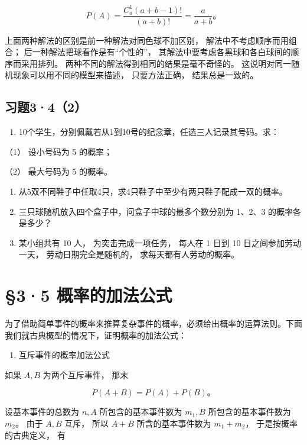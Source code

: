 \[
P(A)=\frac{C_a^1(a+b-1)!}{(a+b)!}=\frac{a}{a+b}\text{。}
\]

上面两种解法的区别是前一种解法对同色球不加区别，
解法中不考虑顺序而用组合； 后一种解法把球看作是有``个性的''，
其解法中要考虑各黑球和各白球间的顺序而采用排列。
两种不同的解法得到相同的结果是毫不奇怪的。
这说明对同一随机现象可以用不同的模型来描述， 只要方法正确，
结果总是一致的。

\subsection{习题3·4（2）}

\begin{enumerate}
\item
  10个学生，分别佩戴若从1到10号的纪念章，任选三人记录其号码。求：
\end{enumerate}

（1） 设小号码为 5 的概率；

（2） 最大号码为 5 的概率。

\begin{enumerate}[start=2]
\item
  从5双不同鞋子中任取4只，求4只鞋子中至少有两只鞋子配成一双的概率。
\item
  三只球随机放入四个盒子中，问盒子中球的最多个数分别为 1、2、3
  的概率各是多少？
\item
  某小组共有 10 人， 为突击完成一项任务， 每人在 1 日到 10
  日之间参加劳动一天， 劳动日期完全是随机的， 求每天都有人劳动的概率。
\end{enumerate}

\section{§3·5 概率的加法公式}

为了借助简单事件的概率来推算复杂事件的概率，必须给出概率的运算法则。下面我们就古典概型的情况下，证明概率的加法公式：

\begin{enumerate}
\item
  互斥事件的概率加法公式
\end{enumerate}

如果 \(A, B\) 为两个互斥事件， 那末

\[
P (A + B) = P (A) + P (B)\text{。} \tag {1}
\]

 设基本事件的总数为 \(n, A\) 所包含的基本事件数为
\(m_1, B\) 所包含的基本事件数为 \(m_2\)。 由于 \(A, B\) 互斥， 所以
\(A + B\) 所含的基本事件数为 \(m_1 + m_2\)， 于是按概率的古典定义， 有

